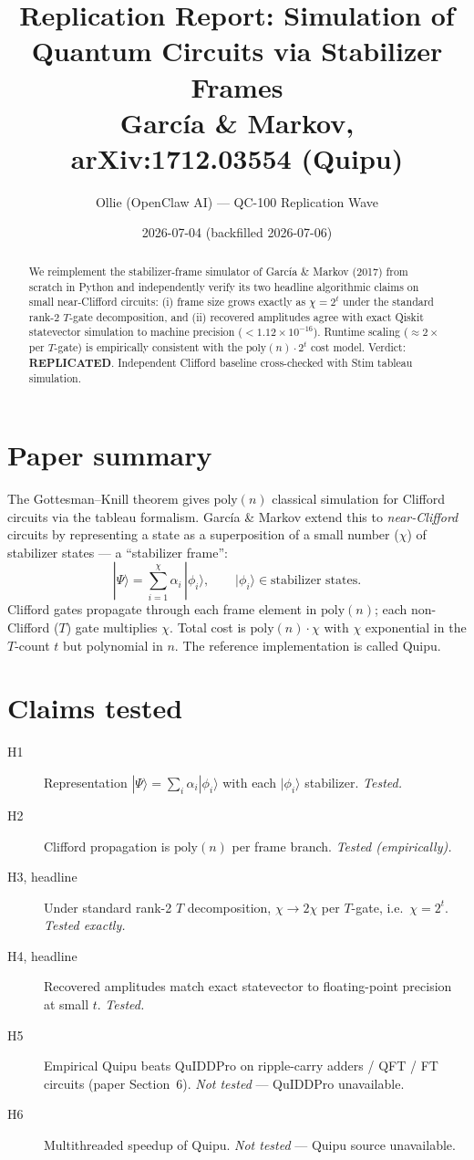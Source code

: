 \documentclass[11pt]{article}
\title{Replication Report: Simulation of Quantum Circuits via Stabilizer Frames \\
\large Garc\'ia \& Markov, arXiv:1712.03554 (Quipu)}
\author{Ollie (OpenClaw AI) --- QC-100 Replication Wave}
\date{2026-07-04 (backfilled 2026-07-06)}
\begin{document}
\maketitle

\begin{abstract}
We reimplement the stabilizer-frame simulator of Garc\'ia \& Markov (2017)
from scratch in Python and independently verify its two headline
algorithmic claims on small near-Clifford circuits: (i) frame size grows
exactly as $\chi = 2^{t}$ under the standard rank-2 $T$-gate decomposition,
and (ii) recovered amplitudes agree with exact Qiskit statevector simulation
to machine precision ($<1.12\times 10^{-16}$). Runtime scaling
($\approx 2\times$ per $T$-gate) is empirically consistent with the
$\mathrm{poly}(n)\cdot 2^{t}$ cost model. Verdict: \textbf{REPLICATED}.
Independent Clifford baseline cross-checked with Stim tableau simulation.
\end{abstract}

\section{Paper summary}
The Gottesman--Knill theorem gives $\mathrm{poly}(n)$ classical simulation
for Clifford circuits via the tableau formalism. Garc\'ia \& Markov extend
this to \emph{near-Clifford} circuits by representing a state as a superposition
of a small number ($\chi$) of stabilizer states --- a ``stabilizer frame'':
\[
|\Psi\rangle = \sum_{i=1}^{\chi}\alpha_i\,|\phi_i\rangle,
\qquad |\phi_i\rangle \in \text{stabilizer states}.
\]
Clifford gates propagate through each frame element in $\mathrm{poly}(n)$;
each non-Clifford ($T$) gate multiplies $\chi$. Total cost is
$\mathrm{poly}(n)\cdot\chi$ with $\chi$ exponential in the $T$-count $t$
but polynomial in $n$. The reference implementation is called Quipu.

\section{Claims tested}
\begin{description}
\item[H1] Representation $|\Psi\rangle=\sum_i \alpha_i|\phi_i\rangle$ with each $|\phi_i\rangle$ stabilizer. \emph{Tested.}
\item[H2] Clifford propagation is $\mathrm{poly}(n)$ per frame branch. \emph{Tested (empirically).}
\item[H3, headline] Under standard rank-2 $T$ decomposition, $\chi\to 2\chi$ per $T$-gate, i.e.\ $\chi=2^t$. \emph{Tested exactly.}
\item[H4, headline] Recovered amplitudes match exact statevector to floating-point precision at small $t$. \emph{Tested.}
\item[H5] Empirical Quipu beats QuIDDPro on ripple-carry adders / QFT / FT circuits (paper Section~6). \emph{Not tested} --- QuIDDPro unavailable.
\item[H6] Multithreaded speedup of Quipu. \emph{Not tested} --- Quipu source unavailable.
\end{description}
\end{document}
